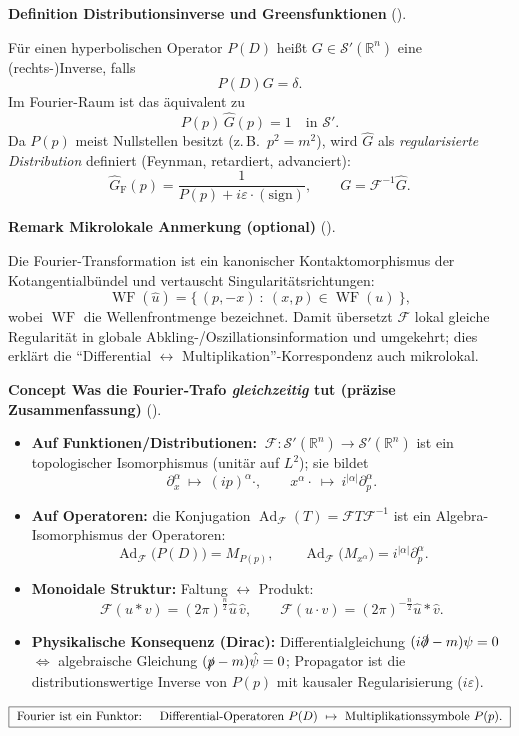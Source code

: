 \documentclass[10pt, letterpaper]{article}
\DeclareMathOperator{\WF}{WF}
\newcommand{\Ad}{\operatorname{Ad}}
\newcommand{\R}{\mathbb{R}}
\newcommand{\CustomHeading}[3]{%
  \par\medskip\noindent%
  \textbf{#1 #2} \textnormal{(#3)}.\enskip%
}
\newenvironment{DEF}[2]{\begin{unitbox}\CustomHeading{Definition}{#1}{#2}}{\end{unitbox}}
\newenvironment{REM}[2]{\begin{unitbox}\CustomHeading{Remark}{#1}{#2}}{\end{unitbox}}
\newenvironment{CONC}[2]{\begin{unitbox}\CustomHeading{Concept}{#1}{#2}}{\end{unitbox}}
\begin{document}


\begin{DEF}{Distributionsinverse und Greensfunktionen}{}
Für einen hyperbolischen Operator $P(D)$ heißt $G\in\mathcal{S}'(\R^n)$ eine (rechts-)Inverse, falls
\[
P(D)G=\delta.
\]
Im Fourier-Raum ist das äquivalent zu
\[
P(p)\,\widehat{G}(p)=1\quad\text{in }\mathcal{S}'.
\]
Da $P(p)$ meist Nullstellen besitzt (z.\,B.\ $p^2=m^2$), wird $\widehat{G}$ als \emph{regularisierte Distribution} definiert (Feynman, retardiert, advanciert):
\[
\widehat{G}_{\mathrm{F}}(p)=\frac{1}{P(p)+i\varepsilon\cdot\mathrm{(sign)}},\qquad
G=\mathcal{F}^{-1}\widehat{G}.
\]
\end{DEF}



\begin{REM}{Mikrolokale Anmerkung (optional)}{}
Die Fourier-Transformation ist ein kanonischer Kontaktomorphismus der Kotangentialbündel und vertauscht Singularitätsrichtungen:
\[
\WF(\hat u)=\{\, (p,-x)\ :\ (x,p)\in\WF(u)\ \},
\]
wobei $\WF$ die Wellenfrontmenge bezeichnet. Damit übersetzt $\mathcal{F}$ lokal gleiche Regularität in globale Abkling-/Oszillationsinformation und umgekehrt; dies erklärt die ``Differential $\leftrightarrow$ Multiplikation''-Korrespondenz auch mikrolokal.
\end{REM}




\begin{CONC}{Was die Fourier-Trafo \emph{gleichzeitig} tut (präzise Zusammenfassung)}{}
\begin{itemize}
\item \textbf{Auf Funktionen/Distributionen:} $\ \mathcal{F}:\mathcal{S}'(\R^n)\to\mathcal{S}'(\R^n)$ ist ein topologischer Isomorphismus (unitär auf $L^2$); sie bildet
\[
\partial_x^\alpha\ \mapsto\ (ip)^\alpha\cdot,\qquad
x^\alpha\cdot\ \mapsto\ i^{|\alpha|}\partial_p^\alpha.
\]
\item \textbf{Auf Operatoren:} die Konjugation $\Ad_{\mathcal{F}}(T)=\mathcal{F}T\mathcal{F}^{-1}$ ist ein Algebra-Isomorphismus der Operatoren:
\[
\Ad_{\mathcal{F}}\big(P(D)\big)=M_{P(p)},\qquad
\Ad_{\mathcal{F}}\big(M_{x^\alpha}\big)=i^{|\alpha|}\partial_p^\alpha.
\]
\item \textbf{Monoidale Struktur:} Faltung $\leftrightarrow$ Produkt:
\[
\mathcal{F}(u*v)=(2\pi)^{\frac{n}{2}}\hat u\,\hat v,\qquad
\mathcal{F}(u\cdot v)=(2\pi)^{-\frac{n}{2}}\hat u*\hat v.
\]
\item \textbf{Physikalische Konsequenz (Dirac):} Differentialgleichung $(i\slashed{\partial}-m)\psi=0$
$\Longleftrightarrow$ algebraische Gleichung $(\slashed{p}-m)\hat\psi=0$; Propagator ist die distributionswertige Inverse von $P(p)$ mit kausaler Regularisierung ($i\varepsilon$).
\end{itemize}
\[
\boxed{\ \text{Fourier ist ein Funktor: \quad Differential-Operatoren }P(D)\ \mapsto\ \text{Multiplikationssymbole }P(p). \ }
\]
\end{CONC}
\end{document}
